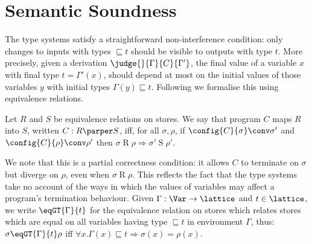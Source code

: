 \documentclass{sigplanconf}
\begin{document}
\section{Semantic Soundness}\label{sect:semantic-soundness}
The type systems satisfy a straightforward non-interference condition:
only changes to inputs with types $\sqsubseteq t$ should be visible
to outputs with type $t$.
More precisely,
given a derivation $\judge{}{\Gamma}{C}{\Gamma'}$, the final value of a variable $x$ with
final type $t = \Gamma'(x)$, should depend at most on the initial values of
those variables $y$ with initial types $\Gamma(y) \sqsubseteq t$.
Following \cite{Hunt:Sands:PEPM91,Sabelfeld:Sands:HOSC01,Heintze:Riecke:Slam} we formalise this using equivalence relations.
\begin{definition}
        Let $R$ and $S$ be equivalence relations on stores.
        We say that program $C$ maps $R$ into $S$, written $C: R \parper S$, iff,
        for all $\sigma, \rho$,
                if $\config{C}{\sigma} \conv \sigma'$
                and $\config{C}{\rho} \conv \rho'$
                then $\sigma \mathrel{R} \rho \Rightarrow \sigma' \mathrel{S} \rho'$.
\end{definition}
We note that this is a partial correctness condition:
it allows $C$ to terminate on $\sigma$ but diverge on $\rho$, even when $\sigma \mathrel{R} \rho$.
This reflects the fact that the type systems take no
account of the ways in which the values of variables may affect a program's termination behaviour.
Given $\Gamma: \Var \rightarrow \lattice$ and $t \in \lattice$, we write
$\eqGT{\Gamma}{t}$ for the equivalence relation on stores which relates stores which are equal
on all variables having type $\sqsubseteq t$ in environment $\Gamma$, thus: $\sigma \eqGT{\Gamma}{t} \rho$ iff
$\forall{x}. \Gamma(x) \sqsubseteq t \Rightarrow \sigma(x) = \rho(x)$.
\end{document}
